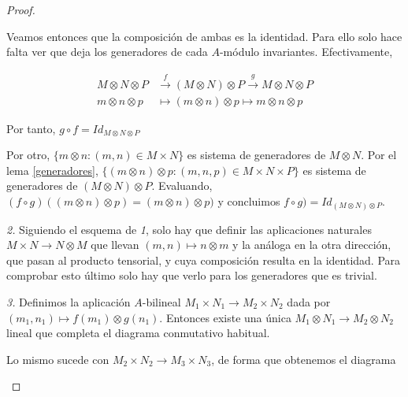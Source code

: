 \documentclass[../main.tex]{subfiles}
\begin{document}
\begin{proof}
\begin{figure}[h!]
\begin{tikzpicture}[x=0.75pt,y=0.75pt,yscale=-1,xscale=1]
		\end{tikzpicture}
	\end{figure}
	
	Veamos entonces que la composición de ambas es la identidad. Para ello solo hace falta ver que deja los generadores de cada $A$-módulo invariantes. Efectivamente,
	
	\begin{align*}
	M\otimes N \otimes P &\overset{f}{\longrightarrow}(M\otimes N )\otimes P \overset{g}{\longrightarrow}M\otimes N \otimes P\\
	m\otimes n\otimes p &\longmapsto (m\otimes n)\otimes p \longmapsto m\otimes n\otimes p
	\end{align*}
	
	Por tanto, $g\circ f=Id_{M\otimes N\otimes P}$
	
	Por otro, $\{m\otimes n:(m,n)\in M\times N\}$ es sistema de generadores de $M\otimes N$. Por el lema \ref{generadores}, $\{(m\otimes n)\otimes p: (m,n,p)\in M\times N\times P\}$ es sistema de generadores de $(M\otimes N)\otimes P$. Evaluando, $(f\circ g)((m\otimes n)\otimes p)=(m\otimes n)\otimes p)$ y concluimos $f\circ g)=Id_{(M\otimes N)\otimes P}$.
	
	\textit{2.} Siguiendo el esquema de \textit{1}, solo hay que definir las aplicaciones naturales $M\times N \to N\otimes M$ que llevan $(m,n)\mapsto n\otimes m$ y la análoga en la otra dirección, que pasan al producto tensorial, y cuya composición resulta en la identidad. Para comprobar esto último solo hay que verlo para los generadores que es trivial.
	
	\textit{3.} Definimos la aplicación $A$-bilineal $M_1\times N_1 \to M_2\times N_2$ dada por $(m_1,n_1) \mapsto f(m_1)\otimes g(n_1)$. Entonces existe una única $M_1\otimes N_1 \to M_2 \otimes N_2$ lineal que completa el diagrama conmutativo habitual.
	
	Lo mismo sucede con $M_2\times N_2 \to M_3\times N_3$, de forma que obtenemos el diagrama
	
	\begin{figure}[h!]
		\centering
		
		
		
		\begin{tikzpicture}[x=0.75pt,y=0.75pt,yscale=-1,xscale=1]
		

\end{tikzpicture}
\end{figure}
\end{proof}
\end{document}
